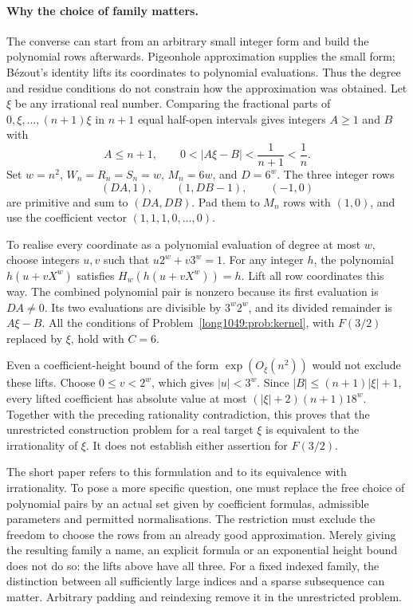\paragraph{Why the choice of family matters.}
The converse can start from an arbitrary small integer form and
build the polynomial rows afterwards. Pigeonhole approximation
supplies the small form; B\'ezout's identity lifts its coordinates
to polynomial evaluations. Thus the degree and residue conditions
do not constrain how the approximation was obtained. Let $\xi$ be
any irrational real number. Comparing the fractional parts
of $0,\xi,\ldots,(n+1)\xi$ in $n+1$ equal half-open intervals gives
integers $A\ge1$ and $B$ with
\[
 A\le n+1,\qquad 0<|A\xi-B|<\frac1{n+1}<\frac1n.
\]
Set $w=n^2$, $W_n=R_n=S_n=w$, $M_n=6w$, and $D=6^w$.
The three integer rows
\[
 (DA,1),\qquad (1,DB-1),\qquad (-1,0)
\]
are primitive and sum to $(DA,DB)$. Pad them to $M_n$ rows with
$(1,0)$, and use the coefficient vector $(1,1,1,0,\ldots,0)$.

To realise every coordinate as a polynomial evaluation of degree at
most $w$, choose integers $u,v$ such that $u2^w+v3^w=1$. For any
integer $h$, the polynomial $h(u+vX^w)$ satisfies
$H_w(h(u+vX^w))=h$. Lift all row coordinates this way.
The combined polynomial pair is nonzero because its first evaluation
is $DA\ne0$. Its two evaluations are divisible by $3^w2^w$, and its
divided remainder is $A\xi-B$. All the conditions of
Problem~\ref{long1049:prob:kernel}, with $F(3/2)$ replaced by $\xi$,
hold with $C=6$.

Even a coefficient-height bound of the form $\exp(O_\xi(n^2))$ would
not exclude these lifts. Choose $0\le v<2^w$, which gives $|u|<3^w$.
Since $|B|\le(n+1)|\xi|+1$, every lifted coefficient has absolute value
at most $(|\xi|+2)(n+1)18^w$.
Together with the preceding rationality contradiction, this proves that
the unrestricted construction problem for a real target $\xi$ is
equivalent to the irrationality of $\xi$. It does not establish either
assertion for $F(3/2)$.

The short paper refers to this formulation and to its equivalence with
irrationality.
To pose a more specific question, one must replace the free choice of
polynomial pairs by an actual set given by coefficient formulas,
admissible parameters and permitted normalisations. The restriction must exclude the freedom to choose the rows from
an already good approximation. Merely giving the resulting family
a name, an explicit formula or an exponential height bound does
not do so: the lifts above have all three. For a fixed indexed family, the distinction between all
sufficiently large indices and a sparse subsequence can matter.
Arbitrary padding and reindexing remove it in the unrestricted problem.


